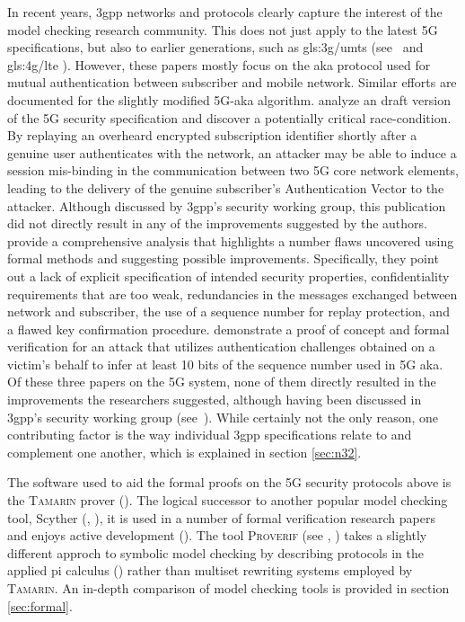 In recent years, \gls{3gpp} networks and protocols clearly capture the interest of the model checking research community.
This does not just apply to the latest 5G specifications, but also to earlier generations, such as \gls{gls:3g}/\gls{umts} (see~\cite{alt2016cryptographic} and \gls{gls:4g}/\gls{lte} \cite{lee2014anonymity}).
However, these papers mostly focus on the \gls{aka} protocol used for mutual authentication between subscriber and mobile network.
Similar efforts are documented for the slightly modified 5G-\gls{aka} algorithm.
\cite{dehnel2018security} analyze an draft version of the 5G security specification and discover a potentially critical race-condition.
By replaying an overheard encrypted subscription identifier shortly after a genuine user authenticates with the network, an attacker may be able to induce a session mis-binding in the communication between two 5G core network elements, leading to the delivery of the genuine subscriber's Authentication Vector to the attacker.
Although discussed by \gls{3gpp}'s security working group, this publication did not directly result in any of the improvements suggested by the authors.
\cite{basin2018formal} provide a comprehensive analysis that highlights a number flaws uncovered using formal methods and suggesting possible improvements.
Specifically, they point out a lack of explicit specification of intended security properties, confidentiality requirements that are too weak, redundancies in the messages exchanged between network and subscriber, the use of a sequence number for replay protection, and a flawed key confirmation procedure.
\cite{borgaonkar2019new} demonstrate a proof of concept and formal verification for an attack that utilizes authentication challenges obtained on a victim's behalf to infer at least 10 bits of the sequence number used in 5G \gls{aka}.
Of these three papers on the 5G system, none of them directly resulted in the improvements the researchers suggested, although having been discussed in \gls{3gpp}'s security working group (see~\cite{s3-180727}).
While certainly not the only reason, one contributing factor is the way individual \gls{3gpp} specifications relate to and complement one another, which is explained in section \ref{sec:n32}.

The software used to aid the formal proofs on the 5G security protocols above is the \textsc{Tamarin} prover (\cite{meier2013tamarin}).
The logical successor to another popular model checking tool, Scyther (\cite{cremers2008scyther}, \cite{scyther}), it is used in a number of formal verification research papers and enjoys active development (\cite{tamarin}).
The tool \textsc{Proverif} (see \cite{blanchet2016modeling}, \cite{proverif}) takes a slightly different approch to symbolic model checking by describing protocols in the applied pi calculus (\cite{ryan2011applied}) rather than multiset rewriting systems employed by \textsc{Tamarin}.
An in-depth comparison of model checking tools is provided in section \ref{sec:formal}.

